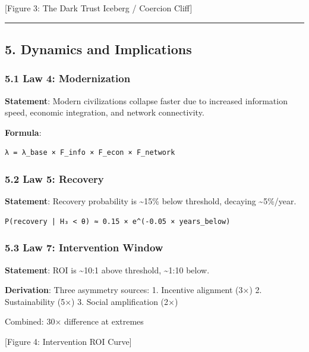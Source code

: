 \documentclass[11pt,letterpaper]{article}
\begin{document}
{[}Figure 3: The Dark Trust Iceberg / Coercion Cliff{]}

\begin{center}\rule{0.5\linewidth}{0.5pt}\end{center}

\subsection{5. Dynamics and
Implications}\label{dynamics-and-implications}

\subsubsection{5.1 Law 4: Modernization}\label{law-4-modernization}

\textbf{Statement}: Modern civilizations collapse faster due to
increased information speed, economic integration, and network
connectivity.

\textbf{Formula}:

\begin{verbatim}
λ = λ_base × F_info × F_econ × F_network
\end{verbatim}

\subsubsection{5.2 Law 5: Recovery}\label{law-5-recovery}

\textbf{Statement}: Recovery probability is \textasciitilde15\% below
threshold, decaying \textasciitilde5\%/year.

\begin{verbatim}
P(recovery | H₃ < θ) ≈ 0.15 × e^(-0.05 × years_below)
\end{verbatim}

\subsubsection{5.3 Law 7: Intervention
Window}\label{law-7-intervention-window}

\textbf{Statement}: ROI is \textasciitilde10:1 above threshold,
\textasciitilde1:10 below.

\textbf{Derivation}: Three asymmetry sources: 1. Incentive alignment
(3×) 2. Sustainability (5×) 3. Social amplification (2×)

Combined: 30× difference at extremes

{[}Figure 4: Intervention ROI Curve{]}
\end{document}
